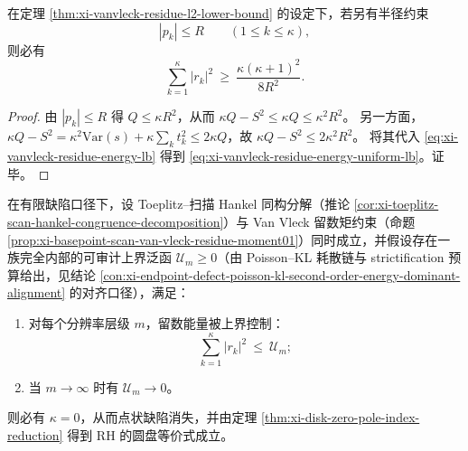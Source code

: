 \begin{corollary}[极点几何有界性导出的统一能量下界]\label{cor:xi-vanvleck-residue-energy-uniform-lb-under-radius}
在定理 \ref{thm:xi-vanvleck-residue-l2-lower-bound} 的设定下，若另有半径约束
\[
|p_k|\le R\qquad(1\le k\le \kappa),
\]
则必有
\begin{equation}\label{eq:xi-vanvleck-residue-energy-uniform-lb}
\sum_{k=1}^{\kappa}|r_k|^2\ \ge\ \frac{\kappa(\kappa+1)^2}{8R^2}.
\end{equation}
\end{corollary}
\begin{proof}
由 \(|p_k|\le R\) 得 \(Q\le \kappa R^2\)，从而 \(\kappa Q-S^2\le \kappa Q\le \kappa^2R^2\)。
另一方面，
\(
\kappa Q-S^2=\kappa^2\mathrm{Var}(s)+\kappa\sum_k t_k^2\le 2\kappa Q
\)，故 \(\kappa Q-S^2\le 2\kappa^2R^2\)。
将其代入 \eqref{eq:xi-vanvleck-residue-energy-lb} 得到 \eqref{eq:xi-vanvleck-residue-energy-uniform-lb}。证毕。
\end{proof}

\begin{conjecture}\label{conj:xi-poisson-kl-vs-vanvleck-residue-energy-closed-loop}
在有限缺陷口径下，设 Toeplitz--扫描 Hankel 同构分解（推论 \ref{cor:xi-toeplitz-scan-hankel-congruence-decomposition}）与 Van Vleck 留数矩约束（命题 \ref{prop:xi-basepoint-scan-van-vleck-residue-moment01}）同时成立，并假设存在一族完全内部的可审计上界泛函 \(\mathcal{U}_m\ge 0\)（由 Poisson--KL 耗散链与 strictification 预算给出，见结论 \ref{con:xi-endpoint-defect-poisson-kl-second-order-energy-dominant-alignment} 的对齐口径），满足：
\begin{enumerate}
  \item 对每个分辨率层级 \(m\)，留数能量被上界控制：
  \[
  \sum_{k=1}^{\kappa}|r_k|^2\ \le\ \mathcal{U}_m;
  \]
  \item 当 \(m\to\infty\) 时有 \(\mathcal{U}_m\to 0\)。
\end{enumerate}
则必有 \(\kappa=0\)，从而点状缺陷消失，并由定理 \ref{thm:xi-disk-zero-pole-index-reduction} 得到 RH 的圆盘等价式成立。
\end{conjecture}

\endinput
